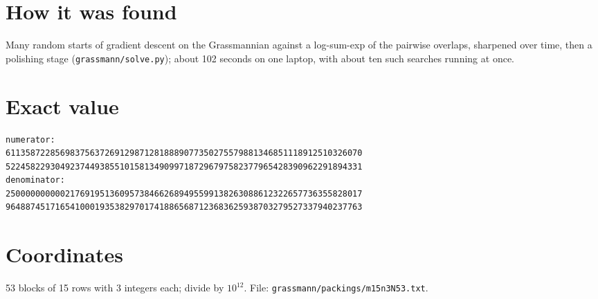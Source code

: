 \documentclass[11pt,a4paper]{article}
\begin{document}
\section{How it was found}
Many random starts of gradient descent on the Grassmannian against a log-sum-exp of the pairwise overlaps, sharpened over time, then a polishing stage (\texttt{grassmann/solve.py}); about 102 seconds on one laptop, with about ten such searches running at once.


\appendix
\section{Exact value}
{\small
\begin{verbatim}
numerator:
611358722856983756372691298712818889077350275579881346851118912510326070
522458229304923744938551015813490997187296797582377965428390962291894331
denominator:
250000000000217691951360957384662689495599138263088612322657736355828017
964887451716541000193538297017418865687123683625938703279527337940237763
\end{verbatim}}

\section{Coordinates}
53 blocks of 15 rows with 3 integers each; divide by $10^{12}$. File: \texttt{grassmann/packings/m15n3N53.txt}.
{\tiny
\begin{multicols}{3}
\end{multicols}}
\end{document}
